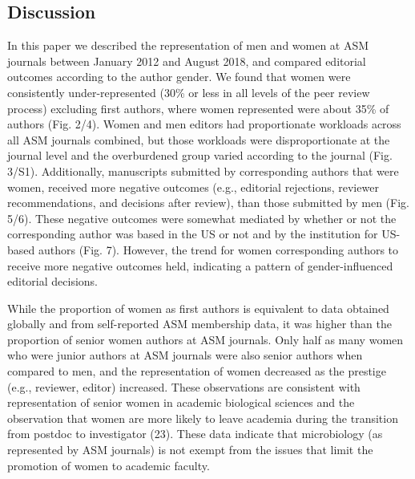 \documentclass[11pt,]{article}
\begin{document}
\subsection{Discussion}\label{discussion}

In this paper we described the representation of men and women at ASM
journals between January 2012 and August 2018, and compared editorial
outcomes according to the author gender. We found that women were
consistently under-represented (30\% or less in all levels of the peer
review process) excluding first authors, where women represented were
about 35\% of authors (Fig. 2/4). Women and men editors had
proportionate workloads across all ASM journals combined, but those
workloads were disproportionate at the journal level and the
overburdened group varied according to the journal (Fig. 3/S1).
Additionally, manuscripts submitted by corresponding authors that were
women, received more negative outcomes (e.g., editorial rejections,
reviewer recommendations, and decisions after review), than those
submitted by men (Fig. 5/6). These negative outcomes were somewhat
mediated by whether or not the corresponding author was based in the US
or not and by the institution for US-based authors (Fig. 7). However,
the trend for women corresponding authors to receive more negative
outcomes held, indicating a pattern of gender-influenced editorial
decisions.

While the proportion of women as first authors is equivalent to data
obtained globally and from self-reported ASM membership data, it was
higher than the proportion of senior women authors at ASM journals. Only
half as many women who were junior authors at ASM journals were also
senior authors when compared to men, and the representation of women
decreased as the prestige (e.g., reviewer, editor) increased. These
observations are consistent with representation of senior women in
academic biological sciences and the observation that women are more
likely to leave academia during the transition from postdoc to
investigator (23). These data indicate that microbiology (as represented
by ASM journals) is not exempt from the issues that limit the promotion
of women to academic faculty.
\end{document}
